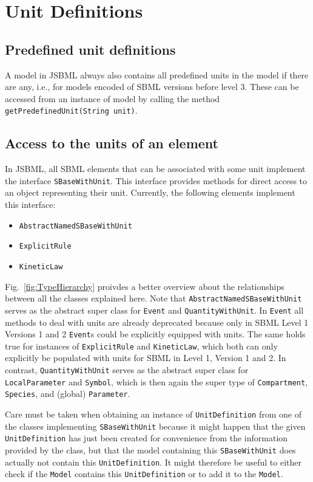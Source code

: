 \documentclass[
  letterpaper,
  11pt,
  headsepline,
  pointlessnumbers,
  tablecaptionabove,
  headinclude,
  appendixprefix,
  idxtotoc,
  bibtotoc,
  titlepage
]{scrartcl}
\begin{document}
\section{Unit Definitions}

\subsection{Predefined unit definitions}

A model in JSBML always also contains all predefined units in the model
if there are any, i.e., for models encoded of SBML versions before level
3. These can be accessed from an instance of model by calling the method
\verb!getPredefinedUnit(String unit)!.

\subsection{Access to the units of an element}

In JSBML, all SBML elements that can be associated with some unit implement the
interface \verb!SBaseWithUnit!. This interface provides methods for direct
access to an object representing their unit. Currently, the following elements
implement this interface:
\begin{itemize}
 \item \verb!AbstractNamedSBaseWithUnit!
 \item \verb!ExplicitRule!
 \item \verb!KineticLaw!
\end{itemize}
Fig.~\vref{fig:TypeHierarchy} proivdes a better overview about the relationships
between all the classes explained here.
Note that \verb!AbstractNamedSBaseWithUnit! serves as the abstract super class
for \verb!Event! and \verb!QuantityWithUnit!. In \verb!Event! all methods to
deal with units are already deprecated because only in SBML Level 1 Versions 1
and 2 \verb!Event!s could be explicitly equipped with units. The same holds true
for instances of \verb!ExplicitRule! and \verb!KineticLaw!, which both can only
explicitly be populated with units for SBML in Level 1, Version 1 and 2. In
contrast, \verb!QuantityWithUnit! serves as the abstract super class for
\verb!LocalParameter! and \verb!Symbol!, which is then again the super type of
\verb!Compartment!, \verb!Species!, and (global) \verb!Parameter!.

Care must be taken when obtaining an instance of \verb!UnitDefinition! from one
of the classes implementing \verb!SBaseWithUnit!
because it might happen that the given \verb!UnitDefinition! has just been
created for convenience from the information provided by the class, but that the
model containing this \verb!SBaseWithUnit! does actually not contain this
\verb!UnitDefinition!. It might therefore be useful to either check if the
\verb!Model! contains this \verb!UnitDefinition! or to add it to the
\verb!Model!.
\end{document}
